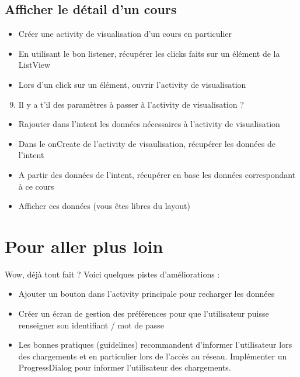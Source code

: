 \documentclass{article}
\begin{document}
\subsection{Afficher le détail d'un cours}
\begin{itemize} 
  \item Créer une activity de visualisation d'un cours en particulier
  \item En utilisant le bon listener, récupérer les clicks faits sur un élément
  de la ListView
  \item Lors d'un click sur un élément, ouvrir l'activity de visualisation
\end{itemize}
\begin{enumerate}
 \setcounter{enumi}{8}
 \item Il y a t'il des paramètres à passer à l'activity de visualisation ?
 \end{enumerate}
 \begin{itemize} 
  \item Rajouter dans l'intent les données nécessaires à l'activity de
  visualisation
  \item Dans le onCreate de l'activity de visaulisation, récupérer les données
  de l'intent
  \item A partir des données de l'intent, récupérer en base les données
  correspondant à ce cours
  \item Afficher ces données (vous êtes libres du layout)
\end{itemize}
\section{Pour aller plus loin}
  Wow, déjà tout fait ? Voici quelques pistes d'améliorations :
\begin{itemize}
  \item Ajouter un bouton dans l'activity principale pour recharger les données
  \item Créer un écran de gestion des préférences pour que l'utilisateur puisse
  renseigner son identifiant / mot de passe
  \item Les bonnes pratiques (guidelines) recommandent d'informer l'utilisateur lors des chargements et en particulier lors de l'accès au réseau. Implémenter un ProgressDialog pour informer l'utilisateur des chargements.
 \end{itemize}
\end{document}
